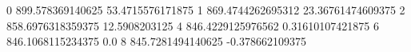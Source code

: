 0 899.578369140625 53.4715576171875
1 869.4744262695312 23.36761474609375
2 858.6976318359375 12.5908203125
4 846.4229125976562 0.31610107421875
6 846.1068115234375 0.0
8 845.7281494140625 -0.378662109375

